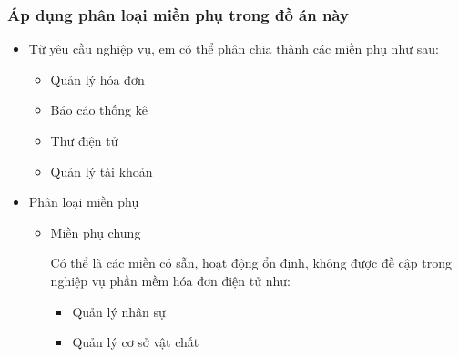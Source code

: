 \subsubsection{Áp dụng phân loại miền phụ trong đồ án này}

\begin{itemize}

    \item Từ yêu cầu nghiệp vụ, em có thể phân chia thành các miền phụ như sau:

          \begin{itemize}

              \item Quản lý hóa đơn

              \item Báo cáo thống kê


              \item Thư điện tử

              \item Quản lý  tài khoản

          \end{itemize}

    \item Phân loại miền phụ

          \begin{itemize}

              \item Miền phụ chung

                    Có thể là các miền có sẵn, hoạt động ổn định, không được đề cập trong nghiệp vụ phần mềm hóa đơn điện tử như:

                    \begin{itemize}

                        \item Quản lý nhân sự

                        \item Quản lý cơ sở vật chất

                    \end{itemize}


\end{itemize}
\end{itemize}
